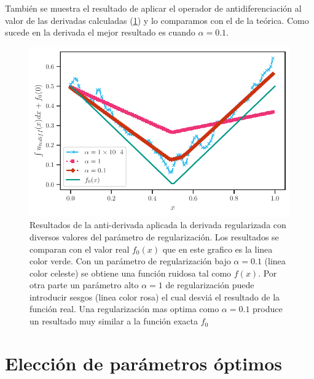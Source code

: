También se muestra el resultado de aplicar el operador de antidiferenciación al valor de las derivadas calculadas (\cref{f:integral_derivada_regularizada}) y lo comparamos con el de la teórica. Como sucede en la derivada el mejor resultado es cuando $\alpha=0.1$. 


\begin{figure}[h!]
	\centering{}\includegraphics[width=\imsize]{integral_derivada_regularizadas.pdf}
	\caption[Resultados de la anti-derivada aplicada la derivada regularizada con diversos valores del parámetro de regularización. ]{Resultados de la anti-derivada aplicada la derivada regularizada  con diversos valores del parámetro de regularización. Los resultados se comparan con el valor real $f_0(x)$ que en este grafico es la linea color verde. Con un parámetro de regularización bajo $\alpha=0.1$ (linea color celeste) se obtiene una función ruidosa tal como $f(x)$.  Por otra parte un parámetro alto $\alpha=1$ de regularización puede introducir sesgos (linea color rosa) el cual desviá el resultado de la función real. Una regularización mas optima  como $\alpha=0.1$  produce un resultado  muy similar a la función exacta $f_0$}\label{f:integral_derivada_regularizada}  
\end{figure}

\section{Elección de parámetros óptimos}\label{sec:parametors_optimos}

